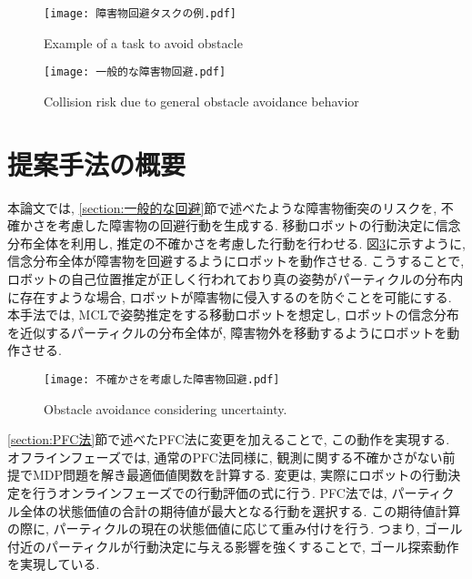 \begin{figure}[h]
  \begin{center}
    \texttt{[image: 障害物回避タスクの例.pdf]}
    \caption{Example of a task to avoid obstacle}
    \label{fig:障害物回避タスクの例}
  \end{center}
\end{figure}

\begin{figure}[h]
  \begin{center}
    \texttt{[image: 一般的な障害物回避.pdf]}
    \caption{Collision risk due to general obstacle avoidance behavior}
    \label{fig:一般的な障害物回避}
  \end{center}
\end{figure}


\section{提案手法の概要} \label{section:method overview}
本論文では, \ref{section:一般的な回避}節で述べたような障害物衝突のリスクを, 
不確かさを考慮した障害物の回避行動を生成する. 
移動ロボットの行動決定に信念分布全体を利用し, 推定の不確かさを考慮した行動を行わせる. 
図\ref{fig:不確かさを考慮した障害物回避}に示すように, 
信念分布全体が障害物を回避するようにロボットを動作させる. 
こうすることで, ロボットの自己位置推定が正しく行われており真の姿勢がパーティクルの分布内に存在すような場合, 
ロボットが障害物に侵入するのを防ぐことを可能にする. 
本手法では, MCLで姿勢推定をする移動ロボットを想定し, 
ロボットの信念分布を近似するパーティクルの分布全体が, 障害物外を移動するようにロボットを動作させる. 

\begin{figure}[h]
  \begin{center}
    \texttt{[image: 不確かさを考慮した障害物回避.pdf]}
    \caption{Obstacle avoidance considering uncertainty.}
    \label{fig:不確かさを考慮した障害物回避}
  \end{center}
\end{figure}

\ref{section:PFC法}節で述べたPFC法に変更を加えることで, この動作を実現する. 
オフラインフェーズでは, 通常のPFC法同様に, 観測に関する不確かさがない前提でMDP問題を解き最適価値関数を計算する. 
変更は, 実際にロボットの行動決定を行うオンラインフェーズでの行動評価の式に行う. 
PFC法では, パーティクル全体の状態価値の合計の期待値が最大となる行動を選択する. 
この期待値計算の際に, パーティクルの現在の状態価値に応じて重み付けを行う. 
つまり, ゴール付近のパーティクルが行動決定に与える影響を強くすることで, ゴール探索動作を実現している. 

